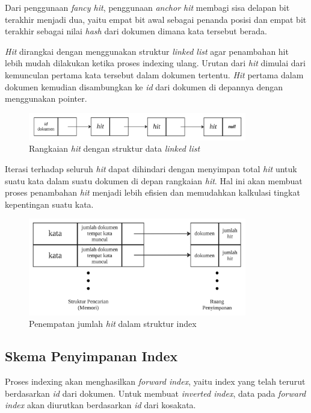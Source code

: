 Dari penggunaan \emph{fancy hit}, penggunaan \emph{anchor hit} membagi sisa
delapan bit terakhir menjadi dua, yaitu empat bit awal sebagai penanda posisi
dan empat bit terakhir sebagai nilai \emph{hash} dari dokumen dimana kata
tersebut berada.

\emph{Hit} dirangkai dengan menggunakan struktur \emph{linked list} agar
penambahan hit lebih mudah dilakukan ketika proses indexing ulang. Urutan dari
\emph{hit} dimulai dari kemunculan pertama kata tersebut dalam dokumen tertentu.
\emph{Hit} pertama dalam dokumen kemudian disambungkan ke \emph{id} dari dokumen
di depannya dengan menggunakan pointer.

\begin{figure}[H]
  \centering{}
	\includegraphics[width=0.85\textwidth]{gambar/linkedListHit}
  \caption{Rangkaian \emph{hit} dengan struktur data \emph{linked list}}
\end{figure}

Iterasi terhadap seluruh \emph{hit} dapat dihindari dengan menyimpan total
\emph{hit} untuk suatu kata dalam suatu dokumen di depan rangkaian \emph{hit}.
Hal ini akan membuat proses penambahan \emph{hit} menjadi lebih efisien dan
memudahkan kalkulasi tingkat kepentingan suatu kata.

\begin{figure}[H]
  \centering{}
	\includegraphics[width=0.85\textwidth]{gambar/hubunganStrukturPencarian}
  \caption{Penempatan jumlah \emph{hit} dalam struktur index}
\end{figure}

\subsection{Skema Penyimpanan Index}

Proses indexing akan menghasilkan \emph{forward index}, yaitu index yang telah
terurut berdasarkan \textit{id} dari dokumen. Untuk membuat \textit{inverted
index}, data pada \textit{forward index} akan diurutkan berdasarkan \textit{id}
dari kosakata.


